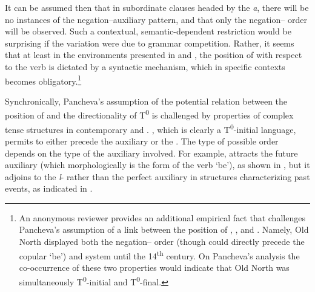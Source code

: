 \documentclass[output=paper,modfonts,newtxmath,hidelinks]{langscibook}
\begin{document}
\noindent It can be assumed then that in subordinate clauses headed by the  \textit{a}, there will be no instances of the negation--auxiliary pattern, and that only the negation-- order will be observed. Such a contextual, semantic-dependent restriction would be surprising if the variation were due to grammar competition. Rather, it seems that at least in the environments presented in  and , the position of  with respect to the verb is dictated by a syntactic mechanism, which in specific contexts becomes obligatory.\footnote{\label{11:fn5}An anonymous reviewer provides an additional empirical fact that challenges Pancheva’s assumption of a link between the position of , , and . Namely, Old North  displayed both the negation-- order (though  could directly precede the copular `be') and   system until the 14\textsuperscript{th} century. On Pancheva’s analysis the co-occurrence of these two properties would indicate that Old North  was simultaneously T\textsuperscript{0}{}-initial and T\textsuperscript{0}{}-final.}  

Synchronically, Pancheva’s assumption of the potential relation between the position of  and the directionality of T\textsuperscript{0} is challenged by properties of complex tense structures in contemporary  and . , which is clearly a T\textsuperscript{0}{}-initial language, permits  to either precede the auxiliary or the . The type of possible order depends on the type of the auxiliary involved. For example,  attracts the future auxiliary (which morphologically is the  form of the verb `be'), as shown in , but it adjoins to the \textit{l}{}- rather than the perfect auxiliary in structures characterizing past events, as indicated in .

\ea \label{11:ex25}
	\label{11:ex25a}
	\label{11:ex25b}
	\z
\z
\end{document}
